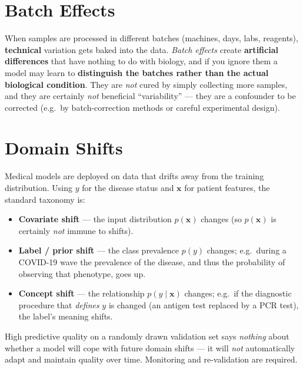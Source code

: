 \documentclass[11pt, oneside]{book}
\newcommand{\xvec}{\mathbf{x}}
\begin{document}
\section{Batch Effects}

When samples are processed in different batches (machines, days, labs, reagents),
\textbf{technical} variation gets baked into the data. \emph{Batch effects} create
\textbf{artificial differences} that have nothing to do with biology, and if you
ignore them a model may learn to \textbf{distinguish the batches rather than the
actual biological condition}. They are \emph{not} cured by simply collecting more
samples, and they are certainly \emph{not} beneficial ``variability'' --- they are a
confounder to be corrected (e.g.\ by batch-correction methods or careful
experimental design).

\section{Domain Shifts}

Medical models are deployed on data that drifts away from the training distribution.
Using $y$ for the disease status and $\xvec$ for patient features, the standard
taxonomy is:

\begin{itemize}
  \item \textbf{Covariate shift} --- the input distribution $p(\xvec)$ changes (so
        $p(\xvec)$ is certainly \emph{not} immune to shifts).
  \item \textbf{Label / prior shift} --- the class prevalence $p(y)$ changes; e.g.\
        during a COVID-19 wave the prevalence of the disease, and thus the
        probability of observing that phenotype, goes up.
  \item \textbf{Concept shift} --- the relationship $p(y\mid \xvec)$ changes; e.g.\
        if the diagnostic procedure that \emph{defines} $y$ is changed (an antigen
        test replaced by a PCR test), the label's meaning shifts.
\end{itemize}

\begin{notebox}[title={Validation accuracy does not buy robustness}]
High predictive quality on a randomly drawn validation set says \emph{nothing} about
whether a model will cope with future domain shifts --- it will \emph{not}
automatically adapt and maintain quality over time. Monitoring and re-validation are
required.
\end{notebox}
\end{document}
